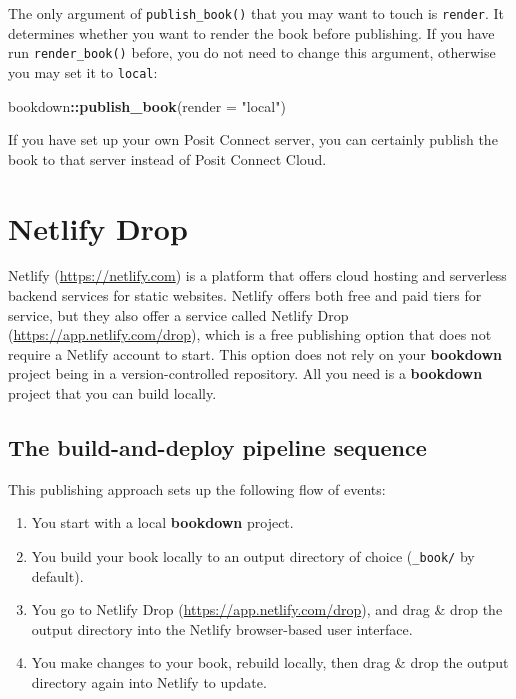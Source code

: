\documentclass[
  12pt,
]{krantz}
\newenvironment{Shaded}{\begin{snugshade}}{\end{snugshade}}
\newcommand{\AttributeTok}[1]{\textcolor[rgb]{0.13,0.29,0.53}{#1}}
\newcommand{\FunctionTok}[1]{\textcolor[rgb]{0.13,0.29,0.53}{\textbf{#1}}}
\newcommand{\NormalTok}[1]{#1}
\newcommand{\SpecialCharTok}[1]{\textcolor[rgb]{0.81,0.36,0.00}{\textbf{#1}}}
\newcommand{\StringTok}[1]{\textcolor[rgb]{0.31,0.60,0.02}{#1}}
\providecommand{\tightlist}{%
  \setlength{\itemsep}{0pt}\setlength{\parskip}{0pt}}
\theoremstyle{definition}
\theoremstyle{definition}
\theoremstyle{definition}
\theoremstyle{definition}
\theoremstyle{remark}
\begin{document}
The only argument of \texttt{publish\_book()} that you may want to touch is \texttt{render}. It determines whether you want to render the book before publishing. If you have run \texttt{render\_book()} before, you do not need to change this argument, otherwise you may set it to \texttt{\textquotesingle{}local\textquotesingle{}}:

\begin{Shaded}
\begin{Highlighting}[]
\NormalTok{bookdown}\SpecialCharTok{::}\FunctionTok{publish\_book}\NormalTok{(}\AttributeTok{render =} \StringTok{"local"}\NormalTok{)}
\end{Highlighting}
\end{Shaded}

If you have set up your own Posit Connect server, you can certainly publish the book to that server instead of Posit Connect Cloud.

\section{Netlify Drop}\label{netlify-drop}

Netlify (\url{https://netlify.com}) is a platform that offers cloud hosting and serverless backend services for static websites. Netlify offers both free and paid tiers for service, but they also offer a service called Netlify Drop (\url{https://app.netlify.com/drop}), which is a free publishing option that does not require a Netlify account to start. This option does not rely on your \textbf{bookdown} project being in a version-controlled repository. All you need is a \textbf{bookdown} project that you can build locally.

\subsection{The build-and-deploy pipeline sequence}\label{the-build-and-deploy-pipeline-sequence}

This publishing approach sets up the following flow of events:

\begin{enumerate}
\def\labelenumi{\arabic{enumi}.}
\tightlist
\item
  You start with a local \textbf{bookdown} project.
\item
  You build your book locally to an output directory of choice (\texttt{\_book/} by default).
\item
  You go to Netlify Drop (\url{https://app.netlify.com/drop}), and drag \& drop the output directory into the Netlify browser-based user interface.
\item
  You make changes to your book, rebuild locally, then drag \& drop the output directory again into Netlify to update.
\end{enumerate}
\end{document}
